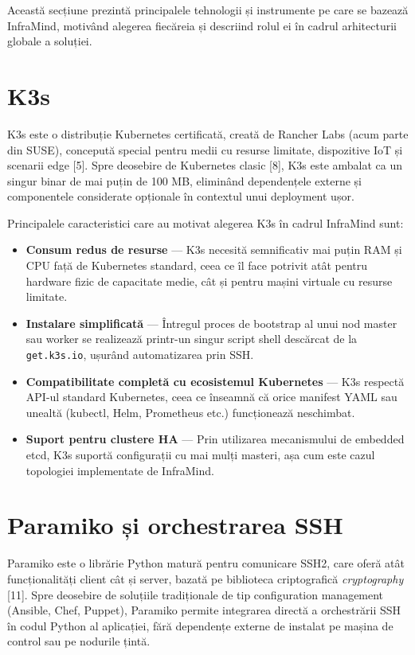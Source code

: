 \documentclass[12pt,a4paper]{report}
\begin{document}
Această secțiune prezintă principalele tehnologii și instrumente pe care se bazează InfraMind, motivând alegerea fiecăreia și descriind rolul ei în cadrul arhitecturii globale a soluției.

\section{K3s}

K3s este o distribuție Kubernetes certificată, creată de Rancher Labs (acum parte din SUSE), concepută special pentru medii cu resurse limitate, dispozitive IoT și scenarii edge [5]. Spre deosebire de Kubernetes clasic [8], K3s este ambalat ca un singur binar de mai puțin de 100 MB, eliminând dependențele externe și componentele considerate opționale în contextul unui deployment ușor.

Principalele caracteristici care au motivat alegerea K3s în cadrul InfraMind sunt:

\begin{itemize}
  \item \textbf{Consum redus de resurse} — K3s necesită semnificativ mai puțin RAM și CPU față de Kubernetes standard, ceea ce îl face potrivit atât pentru hardware fizic de capacitate medie, cât și pentru mașini virtuale cu resurse limitate.
  \item \textbf{Instalare simplificată} — Întregul proces de bootstrap al unui nod master sau worker se realizează printr-un singur script shell descărcat de la \texttt{get.k3s.io}, ușurând automatizarea prin SSH.
  \item \textbf{Compatibilitate completă cu ecosistemul Kubernetes} — K3s respectă API-ul standard Kubernetes, ceea ce înseamnă că orice manifest YAML sau unealtă (kubectl, Helm, Prometheus etc.) funcționează neschimbat.
  \item \textbf{Suport pentru clustere HA} — Prin utilizarea mecanismului de embedded etcd, K3s suportă configurații cu mai mulți masteri, așa cum este cazul topologiei implementate de InfraMind.
\end{itemize}

\section{Paramiko și orchestrarea SSH}

Paramiko este o librărie Python matură pentru comunicare SSH2, care oferă atât funcționalități client cât și server, bazată pe biblioteca criptografică \textit{cryptography} [11]. Spre deosebire de soluțiile tradiționale de tip configuration management (Ansible, Chef, Puppet), Paramiko permite integrarea directă a orchestrării SSH în codul Python al aplicației, fără dependențe externe de instalat pe mașina de control sau pe nodurile țintă.
\end{document}
